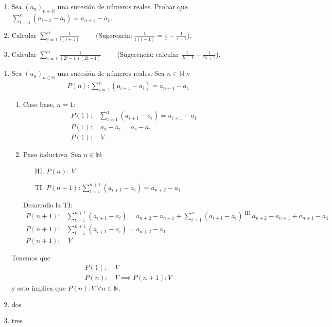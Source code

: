 \ejercicio
\begin{enumerate}[label=\roman*)]
\item Sea $(a_n)_{n \in \mathbb{N}}$ una sucesión de números reales. Probar que $\displaystyle \sum^{n}_{i=1}(a_{i+1} - a_{i}) = a_{n+1} - a_{1}$.
\item Calcular $\displaystyle \sum^{n}_{i=1} \frac{1}{i(i+1)}$ \ \ \ \ (Sugerencia: $\displaystyle \frac{1}{i(i+1)} = \frac{1}{i} - \frac{1}{i+1}$).
\item Calcular $\displaystyle \sum^{n}_{i=1}\frac{1}{(2i-1)(2i+1)}$ \ \ \ \ (Sugerencia: calcular $\displaystyle \frac{1}{2i-1} - \frac{1}{2i+1}$).
\end{enumerate}
\begin{enumerate}[label=\roman*)]
\item Sea $(a_n)_{n \in \mathbb{N}}$ una sucesión de números reales. Sea $n \in \mathbb{N}$ y
\begin{align*}
P(n): \sum^{n}_{i=1}(a_{i+1} - a_{i}) = a_{n+1} - a_{1}
\end{align*}
\begin{enumerate}[label=\arabic*)]
\item Caso base, $ n = 1$:
\begin{align*}
P(1):& \sum^{1}_{i=1}(a_{i+1} - a_{i}) = a_{1+1} - a_{1} \\
P(1):& \ a_{2} - a_{1} = a_{2} - a_{1} \\
P(1):& \ V
\end{align*}
\item Paso inductivo. Sea $n \in \mathbb{N}$:
\begin{enumerate}
\item[HI.] $P(n): \ V$
\item[TI.] $ P(n+1): \displaystyle \sum^{n+1}_{i=1}(a_{i+1} - a_{i}) = a_{n+2} - a_{1} $
\end{enumerate}
Desarrollo la TI:
\begin{align*}
P(n+1):& \sum^{n+1}_{i=1}(a_{i+1} - a_{i}) = a_{n+2} - a_{n+1} + \sum^{n}_{i=1}(a_{i+1} - a_{i}) \overset{\mathrm{HI}}{=} a_{n+2} - a_{n+1} + a_{n+1} - a_{1} \\
P(n+1):& \sum^{n+1}_{i=1}(a_{i+1} - a_{i}) = a_{n+2} - a_{1} \\
P(n+1):& \ V
\end{align*}
\end{enumerate}
Tenemos que
\begin{align*}
P(1):& \ V \\
P(n):& \ V \implies P(n+1):V
\end{align*}
y esto implica que $P(n): V \ \forall n \in \mathbb{N}$.
\item dos
\item tres
\end{enumerate}